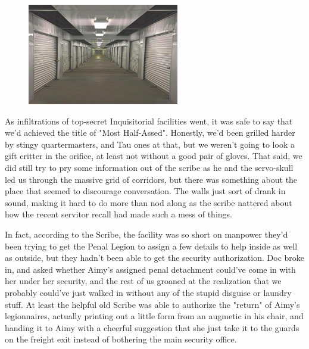 \begin{figure}
	\begin{center}
		\includegraphics[width=\figwidth]{pics/21/73.png}
	\end{center}
\end{figure}
As infiltrations of top-secret Inquisitorial facilities went, it was safe to say that we'd achieved the title of "Most Half-Assed". 
Honestly, we'd been grilled harder by stingy quartermasters, and Tau ones at that, but we weren't going to look a gift critter in the orifice, at least not without a good pair of gloves. 
That said, we did still try to pry some information out of the scribe as he and the servo-skull led us through the massive grid of corridors, but there was something about the place that seemed to discourage conversation. 
The walls just sort of drank in sound, making it hard to do more than nod along as the scribe nattered about how the recent servitor recall had made such a mess of things. 


In fact, according to the Scribe, the facility was so short on manpower they'd been trying to get the Penal Legion to assign a few details to help inside as well as outside, but they hadn't been able to get the security authorization. 
Doc broke in, and asked whether Aimy's assigned penal detachment could've come in with her under her security, and the rest of us groaned at the realization that we probably could've just walked in without any of the stupid disguise or laundry stuff. 
At least the helpful old Scribe was able to authorize the "return" of Aimy's legionnaires, actually printing out a little form from an augmetic in his chair, and handing it to Aimy with a cheerful suggestion that she just take it to the guards on the freight exit instead of bothering the main security office.


